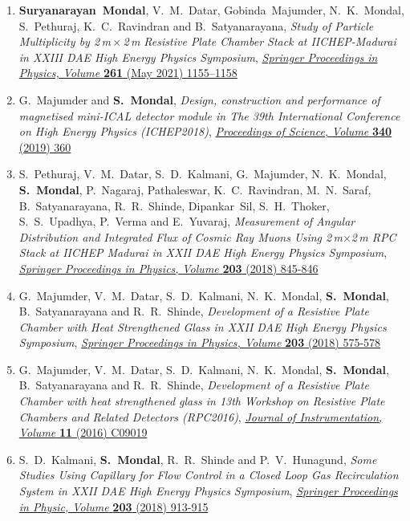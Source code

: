 \documentclass[12pt]{article}
\begin{document}
\begin{minipage}{1.05\textwidth}
\begin{enumerate}[b.]
\begin{enumerate}[1.]
    \item {\bf Suryanarayan~Mondal}, V.~M.~Datar, Gobinda~Majumder, N.~K.~Mondal, S.~Pethuraj, K.~C.~Ravindran and B.~Satyanarayana, \emph{Study of Particle Multiplicity by 2\,m\,$\times$\,2\,m Resistive Plate Chamber Stack at IICHEP-Madurai in XXIII DAE High Energy Physics Symposium}, \href{https://doi.org/10.1007/978-981-33-4408-2_172}{\emph{Springer Proceedings in Physics, Volume } \textbf{261} (May 2021) 1155--1158}
    \item G.~Majumder and {\bf S.~Mondal}, \emph{Design, construction and performance of magnetised mini-ICAL detector module in The 39th International Conference on High Energy Physics (ICHEP2018)}, \href{https://doi.org/10.22323/1.340.0360}{\emph{Proceedings of Science,} \textit{Volume} \textbf{340} (2019) 360}
    \item S.~Pethuraj, V.~M.~Datar, S.~D.~Kalmani, G.~Majumder, N.~K.~Mondal, {\bf S.~Mondal}, P.~Nagaraj, Pathaleswar, K.~C.~Ravindran, M.~N.~Saraf, B.~Satyanarayana, R.~R.~Shinde, Dipankar~Sil, S.~H.~Thoker, S.~S.~Upadhya, P.~Verma and E.~Yuvaraj, \emph{Measurement of Angular Distribution and Integrated Flux of Cosmic Ray Muons Using 2\,m$\times$2\,m RPC Stack at IICHEP Madurai in XXII DAE High Energy Physics Symposium}, \href{https://doi.org/10.1007/978-3-319-73171-1_205}{\emph{Springer Proceedings in Physics,} \emph{Volume} \textbf{203} (2018) 845-846}
    \item G.~Majumder, V.~M.~Datar, S.~D.~Kalmani, N.~K.~Mondal, {\bf S.~Mondal}, B.~Satyanarayana and R.~R.~Shinde, \emph{Development of a Resistive Plate Chamber with Heat Strengthened Glass in XXII DAE High Energy Physics Symposium}, \href{https://doi.org/10.1007/978-3-319-73171-1_135}{\emph{Springer Proceedings in Physics, Volume} \textbf{203} (2018) 575-578}
    \item  G.~Majumder, V.~M.~Datar, S.~D.~Kalmani, N.~K.~Mondal, {\bf S.~Mondal}, B.~Satyanarayana and R.~R.~Shinde, \emph{Development of a Resistive Plate Chamber with heat strengthened glass in 13th Workshop on Resistive Plate Chambers and Related Detectors (RPC2016)}, \href{https://doi.org/10.1088/1748-0221/11/09/C09019}{\emph{Journal of Instrumentation, Volume} \textbf{11} (2016) C09019}
    \item S.~D.~Kalmani, {\bf S.~Mondal}, R.~R.~Shinde and P.~V.~Hunagund, \emph{Some Studies Using Capillary for Flow Control in a Closed Loop Gas Recirculation System in XXII DAE High Energy Physics Symposium}, \href{https://doi.org/10.1007/978-3-319-73171-1_223}{\emph{Springer Proceedings in Physic, Volume} \textbf{203} (2018) 913-915}
    \end{enumerate}
  \end{enumerate}
\end{minipage}
\newpage
\end{document}
